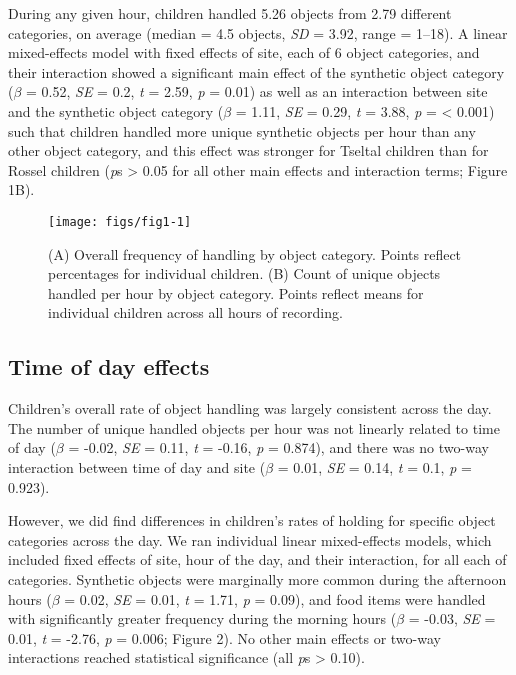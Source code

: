 \documentclass[10pt, letterpaper]{article}
\newenvironment{CodeChunk}{}{}
\begin{document}
During any given hour, children handled 5.26 objects from 2.79 different
categories, on average (median = 4.5 objects, \emph{SD} = 3.92, range =
1--18). A linear mixed-effects model with fixed effects of site, each of
6 object categories, and their interaction showed a significant main
effect of the synthetic object category (\(\beta\) = 0.52, \emph{SE} =
0.2, \emph{t} = 2.59, \emph{p} = 0.01) as well as an interaction between
site and the synthetic object category (\(\beta\) = 1.11, \emph{SE} =
0.29, \emph{t} = 3.88, \emph{p} = \textless{} 0.001) such that children
handled more unique synthetic objects per hour than any other object
category, and this effect was stronger for Tseltal children than for
Rossel children (\emph{p}s \textgreater{} 0.05 for all other main
effects and interaction terms; Figure 1B).

\begin{CodeChunk}
\begin{figure}[h]

{\centering \texttt{[image: figs/fig1-1]} 

}

\caption[(A) Overall frequency of handling by object category]{(A) Overall frequency of handling by object category. Points reflect percentages for individual children. (B) Count of unique objects handled per hour by object category. Points reflect means for individual children across all hours of recording.}\label{fig:fig1}
\end{figure}
\end{CodeChunk}

\hypertarget{time-of-day-effects}{%
\subsection{Time of day effects}\label{time-of-day-effects}}

Children's overall rate of object handling was largely consistent across
the day. The number of unique handled objects per hour was not linearly
related to time of day (\(\beta\) = -0.02, \emph{SE} = 0.11, \emph{t} =
-0.16, \emph{p} = 0.874), and there was no two-way interaction between
time of day and site (\(\beta\) = 0.01, \emph{SE} = 0.14, \emph{t} =
0.1, \emph{p} = 0.923).

However, we did find differences in children's rates of holding for
specific object categories across the day. We ran individual linear
mixed-effects models, which included fixed effects of site, hour of the
day, and their interaction, for all each of categories. Synthetic
objects were marginally more common during the afternoon hours
(\(\beta\) = 0.02, \emph{SE} = 0.01, \emph{t} = 1.71, \emph{p} = 0.09),
and food items were handled with significantly greater frequency during
the morning hours (\(\beta\) = -0.03, \emph{SE} = 0.01, \emph{t} =
-2.76, \emph{p} = 0.006; Figure 2). No other main effects or two-way
interactions reached statistical significance (all \emph{p}s
\textgreater{} 0.10).
\end{document}
